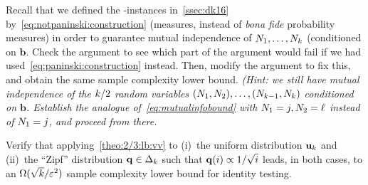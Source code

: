 \begin{question}[$\star$]\label{exo:paninski:mi:lb}
Recall that we defined the \no-instances in~\cref{ssec:dk16} by~\cref{eq:notpaninski:construction} (measures, instead of \emph{bona fide} probability measures) in order to guarantee mutual independence of $N_1,\dots,N_k$ (conditioned on $\mathbf{b}$. Check the argument to see which part of the argument would fail if we had used~\cref{eq:paninski:construction} instead. Then, modify the argument to fix this, and obtain the same sample complexity lower bound. \textit{(Hint: we still have mutual independence of the $k/2$ random variables $(N_1, N_2),\dots,(N_{k-1}, N_k)$ conditioned on $\mathbf{b}$. Establish the analogue of~\cref{eq:mutualinfobound} with $N_1=j,N_2=\ell$ instead of $N_1=j$, and proceed from there.}
\end{question}

\begin{question}\label{ex:2/3:lb:applications}
Verify that applying~\cref{theo:2/3:lb:vv} to (i)~the uniform distribution $\mathbf{u}_k$ and (ii)~the ``Zipf'' distribution $\mathbf{q}\in\Delta_{k}$ such that $\mathbf{q}(i) \propto 1/\sqrt{i}$ leads, in both cases, to an $\Omega(\sqrt{k}/\varepsilon^2)$ sample complexity lower bound for identity testing.
\end{question}

